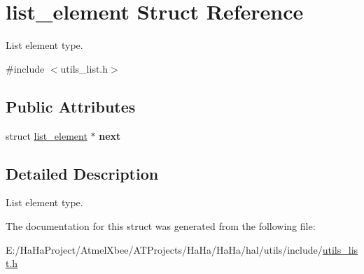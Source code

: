 \hypertarget{structlist__element}{}\section{list\+\_\+element Struct Reference}
\label{structlist__element}


List element type.  




{\ttfamily \#include $<$utils\+\_\+list.\+h$>$}

\subsection*{Public Attributes}
\begin{DoxyCompactItemize}
\item 
\mbox{\label{structlist__element_a66e1becb179745b2a4070941b9a4052d}} 
struct \hyperlink{structlist__element}{list\+\_\+element} $\ast$ {\bfseries next}
\end{DoxyCompactItemize}


\subsection{Detailed Description}
List element type. 

The documentation for this struct was generated from the following file\+:\begin{DoxyCompactItemize}
\item 
E\+:/\+Ha\+Ha\+Project/\+Atmel\+Xbee/\+A\+T\+Projects/\+Ha\+Ha/\+Ha\+Ha/hal/utils/include/\hyperlink{utils__list_8h}{utils\+\_\+list.\+h}\end{DoxyCompactItemize}
